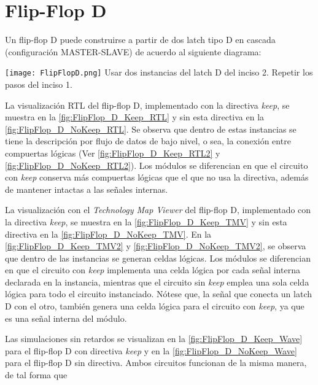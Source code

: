 \section{Flip-Flop D \label{sec:s3}}

\begin{center}
	\begin{minipage}{12cm}
		\begin{tcolorbox}[title=Actividad 3]
			 Un flip-flop D puede construirse a partir de dos latch tipo D en cascada (configuración MASTER-SLAVE) de acuerdo al siguiente diagrama:\enter
			 
			 \texttt{[image: FlipFlopD.png]}
			 Usar dos instancias del latch D del inciso 2. Repetir los pasos del inciso 1.
		\end{tcolorbox}	
	\end{minipage}
\end{center}

La visualización RTL del flip-flop D, implementado con la directiva \textit{keep}, se muestra en la \autoref{fig:FlipFlop_D_Keep_RTL} y sin esta directiva en la \autoref{fig:FlipFlop_D_NoKeep_RTL}. Se observa que dentro de estas instancias se tiene la descripción por flujo de datos de bajo nivel, o sea, la conexión entre compuertas lógicas (Ver \autoref{fig:FlipFlop_D_Keep_RTL2} y \autoref{fig:FlipFlop_D_NoKeep_RTL2}). Los módulos se diferencian en que el circuito con \textit{keep} conserva más compuertas lógicas que el que no usa la directiva, además de mantener intactas a las señales internas.

La visualización con el \textit{Technology Map Viewer} del flip-flop D, implementado con la directiva \textit{keep}, se muestra en la \autoref{fig:FlipFlop_D_Keep_TMV} y sin esta directiva en la \autoref{fig:FlipFlop_D_NoKeep_TMV}. En la \autoref{fig:FlipFlop_D_Keep_TMV2} y \autoref{fig:FlipFlop_D_NoKeep_TMV2}, se observa que dentro de las instancias se generan celdas lógicas. Los módulos se diferencian en que el circuito con \textit{keep} implementa una celda lógica por cada señal interna declarada en la instancia, mientras que el circuito sin \textit{keep} emplea una sola celda lógica para todo el circuito instanciado. Nótese que, la señal que conecta un latch D con el otro, también genera una celda lógica para el circuito con \textit{keep}, ya que es una señal interna del módulo.

Las simulaciones sin retardos se visualizan en la \autoref{fig:FlipFlop_D_Keep_Wave} para el flip-flop D con directiva \textit{keep} y en la \autoref{fig:FlipFlop_D_NoKeep_Wave} para el flip-flop D sin directiva. Ambos circuitos funcionan de la misma manera, de tal forma que 

